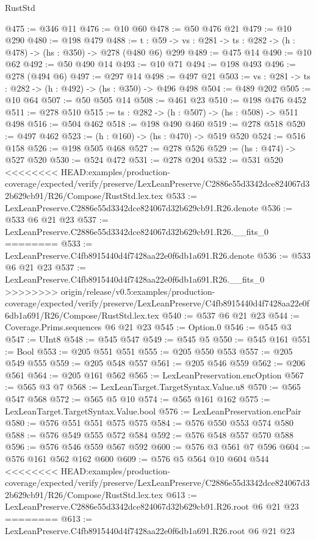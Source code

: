 \begin{lexlean}{RustStd}
\begin{coremodule}
{\begin{coremodule}
@475 := @346 @11
@476 := @10 @60
@478 := @50 @476 @21
@479 := @10 @290
@480 := @198 @479
@488 := {t : @59} -> {vs : @281} -> {ts : @282} -> (h : @478) -> (hs : @350) -> @278 (@480 @6) @299
@489 := @475 @14
@490 := @10 @62
@492 := @50 @490 @14
@493 := @10 @71
@494 := @198 @493
@496 := @278 (@494 @6)
@497 := @297 @14
@498 := @497 @21
@503 := {vs : @281} -> {ts : @282} -> (h : @492) -> (hs : @350) -> @496 @498
@504 := @489 @202
@505 := @10 @64
@507 := @50 @505 @14
@508 := @461 @23
@510 := @198 @476 @452
@511 := @278 @510
@515 := {ts : @282} -> (h : @507) -> (hs : @508) -> @511 @498
@516 := @504 @462
@518 := @198 @490 @460
@519 := @278 @518
@520 := @497 @462
@523 := (h : @160) -> (hs : @470) -> @519 @520
@524 := @516 @158
@526 := @198 @505 @468
@527 := @278 @526
@529 := (hs : @474) -> @527 @520
@530 := @524 @472
@531 := @278 @204
@532 := @531 @520
<<<<<<<< HEAD:examples/production-coverage/expected/verify/preserve/LexLeanPreserve/C2886e55d3342dce824067d32b629cb91/R26/Compose/RustStd.lex.tex
@533 := LexLeanPreserve.C2886e55d3342dce824067d32b629cb91.R26.denote
@536 := @533 @6 @21 @23
@537 := LexLeanPreserve.C2886e55d3342dce824067d32b629cb91.R26.__fits_0
========
@533 := LexLeanPreserve.C4fb8915440d4f7428aa22e0f6db1a691.R26.denote
@536 := @533 @6 @21 @23
@537 := LexLeanPreserve.C4fb8915440d4f7428aa22e0f6db1a691.R26.__fits_0
>>>>>>>> origin/release/v0.5:examples/production-coverage/expected/verify/preserve/LexLeanPreserve/C4fb8915440d4f7428aa22e0f6db1a691/R26/Compose/RustStd.lex.tex
@540 := @537 @6 @21 @23
@544 := Coverage.Prims.sequences @6 @21 @23
@545 := Option.{0}
@546 := @545 @3
@547 := UInt8
@548 := @545 @547
@549 := @545 @5
@550 := @545 @161
@551 := Bool
@553 := @205 @551 @551
@555 := @205 @550 @553
@557 := @205 @549 @555
@559 := @205 @548 @557
@561 := @205 @546 @559
@562 := @206 @561
@564 := @205 @161 @562
@565 := LexLeanPreservation.encOption
@567 := @565 @3 @7
@568 := LexLeanTarget.TargetSyntax.Value.u8
@570 := @565 @547 @568
@572 := @565 @5 @10
@574 := @565 @161 @162
@575 := LexLeanTarget.TargetSyntax.Value.bool
@576 := LexLeanPreservation.encPair
@580 := @576 @551 @551 @575 @575
@584 := @576 @550 @553 @574 @580
@588 := @576 @549 @555 @572 @584
@592 := @576 @548 @557 @570 @588
@596 := @576 @546 @559 @567 @592
@600 := @576 @3 @561 @7 @596
@604 := @576 @161 @562 @162 @600
@609 := @576 @5 @564 @10 @604 @544
<<<<<<<< HEAD:examples/production-coverage/expected/verify/preserve/LexLeanPreserve/C2886e55d3342dce824067d32b629cb91/R26/Compose/RustStd.lex.tex
@613 := LexLeanPreserve.C2886e55d3342dce824067d32b629cb91.R26.root @6 @21 @23
========
@613 := LexLeanPreserve.C4fb8915440d4f7428aa22e0f6db1a691.R26.root @6 @21 @23

\end{coremodule}}
\end{coremodule}
\end{lexlean}
